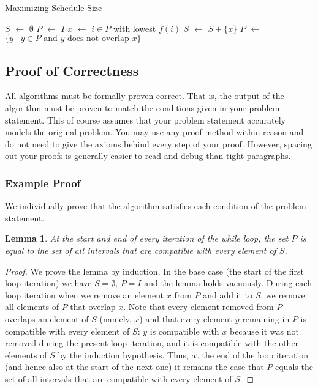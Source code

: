 \documentclass[12pt]{article}
\newcommand*\Let[2]{\State #1 $\gets$ #2}
\newtheorem{lemma}[theorem]{Lemma}
\begin{document}
\begin{algorithm}[H]
  \caption{Maximizing Schedule Size}
  \begin{algorithmic}
		\Let{$S$}{$\emptyset$} 
		\Let{$P$}{$I$} 
			\Let{$x$}{$i \in P$ with lowest $f(i)$}
			\Let{$S$}{$S + \{x\}$}
			\Let{$P$}{$\{y \mid  y \in P \mbox{ and } y \mbox{ does not overlap } x\}$}
		\EndWhile
		\State {}
	\EndFunction
  \end{algorithmic}
\end{algorithm}

\subsection{Proof of Correctness}
All algorithms must be formally proven correct. That is, the output of the algorithm must be proven to match the conditions given in your problem statement. This of course assumes that your problem statement accurately models the original problem. You may use any proof method within reason and do not need to give the axioms behind every step of your proof. However, spacing out your proofs is generally easier to read and debug than tight paragraphs. 

\subsubsection{Example Proof}
We individually prove that the algorithm satisfies each condition of the problem statement.

\begin{lemma} \label{lem:invariant}
At the start and end of every iteration of the while loop, the set $P$
is equal to the set of all intervals that are compatible with
every element of $S$.
\end{lemma}
\begin{proof} 
We prove the lemma by induction. In the base case (the start of the
first loop iteration) we have $S=\emptyset, \, P=I$ and the lemma
holds vacuously. During each loop iteration when we remove an 
element $x$ from $P$ and add it to $S$, we remove all elements of $P$
that overlap $x$. Note that every element removed from $P$ overlaps
an element of $S$ (namely, $x$) and that every element $y$ remaining in $P$
is compatible with every element of $S$: $y$ is compatible with $x$ because
it was not removed during the present loop iteration, and it is compatible
with the other elements of $S$ by the induction hypothesis. Thus,
at the end of the loop iteration (and hence also at the start of the
next one) it remains the case that $P$ equals the set of all intervals
that are compatible with every element of $S$.
\end{proof}
\end{document}
